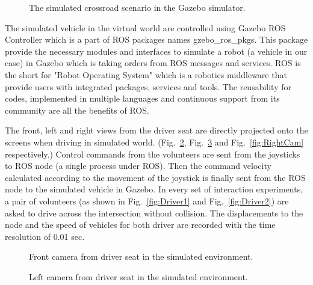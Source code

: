 \begin{figure}[htbp!]
\begin{center}
\end{center}
\caption{The simulated crossroad scenario in the Gazebo simulator.}
\label{fig:GazeboCrossroad} 
\end{figure}

The simulated vehicle in the virtual world are controlled using Gazebo ROS Controller which is a part of ROS packages names gzebo\_ros\_pkgs. This package provide the necessary modules and interfaces to simulate a robot (a vehicle in our case) in Gazebo which is taking orders from ROS messages and services. ROS is the short for "Robot Operating System" which is a robotics middleware that provide users with integrated packages, services and tools. The reusability for codes, implemented in multiple languages and continuous support from its community are all the benefits of ROS. 


The front, left and right views from the driver seat are directly projected onto the screens when driving in simulated world. (Fig.~\ref{fig:FrontCam}, Fig.~\ref{fig:LeftCam} and Fig.~\ref{fig:RightCam} respectively.) Control commands from the volunteers are sent from the joysticks to ROS node (a single process under ROS). Then the command velocity calculated according to the movement of the joystick is finally sent from the ROS node to the simulated vehicle in Gazebo. In every set of interaction experiments, a pair of volunteers (as shown in Fig.~\ref{fig:Driver1} and Fig.~\ref{fig:Driver2}) are asked to drive across the intersection without collision. The displacements to the node and the speed of vehicles for both driver are recorded with the time resolution of 0.01 sec. 

\begin{figure}[htbp!]
\begin{center}
\end{center}
\caption{Front camera from driver seat in the simulated environment.}
\label{fig:FrontCam} 
\end{figure}

\begin{figure}[htbp!]
\begin{center}
\end{center}
\caption{Left camera from driver seat in the simulated environment.}
\label{fig:LeftCam} 
\end{figure}

